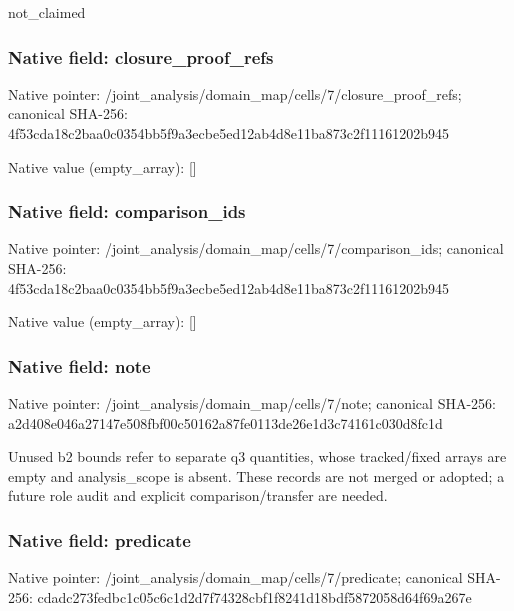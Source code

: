 \documentclass[10pt,a4paper]{article}
\begin{document}
\begingroup\raggedright\sloppy not\_\allowbreak{}claimed\par\endgroup

\subsubsection{Native field: closure\_\allowbreak{}proof\_\allowbreak{}refs}
Native pointer: /joint\_\allowbreak{}analysis/domain\_\allowbreak{}map/cells/7/closure\_\allowbreak{}proof\_\allowbreak{}refs; canonical SHA-256: 4f53cda18c2baa0c0354bb5f9a3ecbe5ed12ab4d8e11ba873c2f11161202b945

Native value (empty\_\allowbreak{}array): []

\subsubsection{Native field: comparison\_\allowbreak{}ids}
Native pointer: /joint\_\allowbreak{}analysis/domain\_\allowbreak{}map/cells/7/comparison\_\allowbreak{}ids; canonical SHA-256: 4f53cda18c2baa0c0354bb5f9a3ecbe5ed12ab4d8e11ba873c2f11161202b945

Native value (empty\_\allowbreak{}array): []

\subsubsection{Native field: note}
Native pointer: /joint\_\allowbreak{}analysis/domain\_\allowbreak{}map/cells/7/note; canonical SHA-256: a2d408e046a27147e508fbf00c50162a87fe0113de26e1d3c74161c030d8fc1d

\begingroup\raggedright\sloppy Unused b2 bounds refer to separate q3 quantities,\allowbreak{} whose tracked/\allowbreak{}fixed arrays are empty and analysis\_\allowbreak{}scope is absent. These records are not merged or adopted;\allowbreak{} a future role audit and explicit comparison/\allowbreak{}transfer are needed.\par\endgroup

\subsubsection{Native field: predicate}
Native pointer: /joint\_\allowbreak{}analysis/domain\_\allowbreak{}map/cells/7/predicate; canonical SHA-256: cdadc273fedbc1c05c6c1d2d7f74328cbf1f8241d18bdf5872058d64f69a267e
\end{document}
